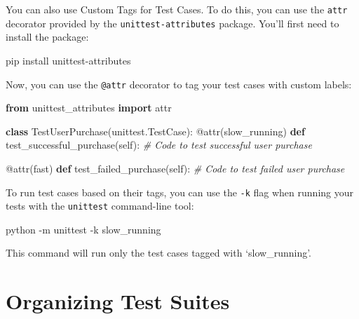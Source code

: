 \documentclass[
  paper=a4,
  ,captions=tableheading
]{scrartcl}
\newenvironment{Shaded}{}{}
\newcommand{\AttributeTok}[1]{\textcolor[rgb]{0.49,0.56,0.16}{#1}}
\newcommand{\CommentTok}[1]{\textcolor[rgb]{0.38,0.63,0.69}{\textit{#1}}}
\newcommand{\ExtensionTok}[1]{#1}
\newcommand{\ImportTok}[1]{\textcolor[rgb]{0.00,0.50,0.00}{\textbf{#1}}}
\newcommand{\KeywordTok}[1]{\textcolor[rgb]{0.00,0.44,0.13}{\textbf{#1}}}
\newcommand{\NormalTok}[1]{#1}
\newcommand{\StringTok}[1]{\textcolor[rgb]{0.25,0.44,0.63}{#1}}
\newcommand{\VariableTok}[1]{\textcolor[rgb]{0.10,0.09,0.49}{#1}}
\begin{document}
You can also use Custom Tags for Test Cases. To do this, you can use the
\texttt{attr} decorator provided by the \texttt{unittest-attributes}
package. You'll first need to install the package:

\begin{Shaded}
\begin{Highlighting}[]
\ExtensionTok{pip}\NormalTok{ install unittest{-}attributes}
\end{Highlighting}
\end{Shaded}

Now, you can use the \texttt{@attr} decorator to tag your test cases
with custom labels:

\begin{Shaded}
\begin{Highlighting}[]
\ImportTok{from}\NormalTok{ unittest\_attributes }\ImportTok{import}\NormalTok{ attr}

\KeywordTok{class}\NormalTok{ TestUserPurchase(unittest.TestCase):}
    \AttributeTok{@attr}\NormalTok{(}\StringTok{\textquotesingle{}slow\_running\textquotesingle{}}\NormalTok{)}
    \KeywordTok{def}\NormalTok{ test\_successful\_purchase(}\VariableTok{self}\NormalTok{):}
        \CommentTok{\# Code to test successful user purchase}

    \AttributeTok{@attr}\NormalTok{(}\StringTok{\textquotesingle{}fast\textquotesingle{}}\NormalTok{)}
    \KeywordTok{def}\NormalTok{ test\_failed\_purchase(}\VariableTok{self}\NormalTok{):}
        \CommentTok{\# Code to test failed user purchase}
\end{Highlighting}
\end{Shaded}

To run test cases based on their tags, you can use the \texttt{-k} flag
when running your tests with the \texttt{unittest} command-line tool:

\begin{Shaded}
\begin{Highlighting}[]
\ExtensionTok{python} \AttributeTok{{-}m}\NormalTok{ unittest }\AttributeTok{{-}k} \StringTok{\textquotesingle{}slow\_running\textquotesingle{}}
\end{Highlighting}
\end{Shaded}

This command will run only the test cases tagged with `slow\_running'.

\hypertarget{organizing-test-suites}{%
\section{Organizing Test Suites}\label{organizing-test-suites}}
\end{document}
